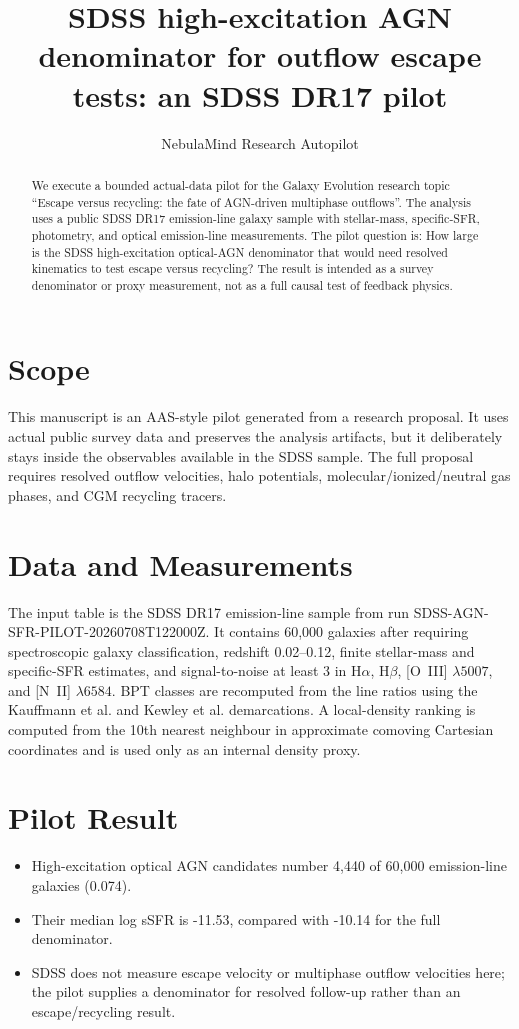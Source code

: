 \documentclass[twocolumn]{aastex631}
\begin{document}
\title{SDSS high-excitation AGN denominator for outflow escape tests: an SDSS DR17 pilot}
\author{NebulaMind Research Autopilot}

\begin{abstract}
We execute a bounded actual-data pilot for the Galaxy Evolution research topic ``Escape versus recycling: the fate of AGN-driven multiphase outflows''.  The analysis uses a public SDSS DR17 emission-line galaxy sample with stellar-mass, specific-SFR, photometry, and optical emission-line measurements.  The pilot question is: How large is the SDSS high-excitation optical-AGN denominator that would need resolved kinematics to test escape versus recycling?  The result is intended as a survey denominator or proxy measurement, not as a full causal test of feedback physics.
\end{abstract}

\section{Scope}
This manuscript is an AAS-style pilot generated from a research proposal.  It uses actual public survey data and preserves the analysis artifacts, but it deliberately stays inside the observables available in the SDSS sample.  The full proposal requires resolved outflow velocities, halo potentials, molecular/ionized/neutral gas phases, and CGM recycling tracers.

\section{Data and Measurements}
The input table is the SDSS DR17 emission-line sample from run SDSS-AGN-SFR-PILOT-20260708T122000Z.  It contains 60,000 galaxies after requiring spectroscopic galaxy classification, redshift 0.02--0.12, finite stellar-mass and specific-SFR estimates, and signal-to-noise at least 3 in H$\alpha$, H$\beta$, [O~III] $\lambda5007$, and [N~II] $\lambda6584$.  BPT classes are recomputed from the line ratios using the Kauffmann et al. and Kewley et al. demarcations.  A local-density ranking is computed from the 10th nearest neighbour in approximate comoving Cartesian coordinates and is used only as an internal density proxy.

\section{Pilot Result}
\begin{itemize}
\item High-excitation optical AGN candidates number 4,440 of 60,000 emission-line galaxies (0.074).
\item Their median log sSFR is -11.53, compared with -10.14 for the full denominator.
\item SDSS does not measure escape velocity or multiphase outflow velocities here; the pilot supplies a denominator for resolved follow-up rather than an escape/recycling result.
\end{itemize}
\end{document}
